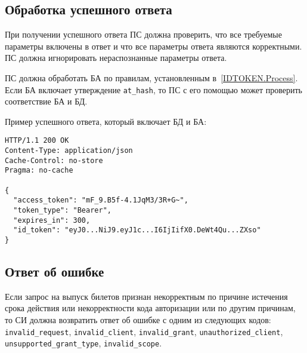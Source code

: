 \subsection{Обработка успешного ответа}\label{REQRESP.Token.Resp}

При получении успешного ответа ПС должна проверить, что все
требуемые параметры включены в ответ и что все параметры ответа являются
корректными. ПС должна игнорировать нераспознанные параметры ответа.

ПС должна обработать БА по правилам, установленным в~\ref{IDTOKEN.Process}.
%
Если БА включает утверждение \lstinline{at_hash}, то ПС с его помощью 
может проверить соответствие БА и БД.

Пример успешного ответа, который включает БД и БА:
%
\begin{lstlisting}
HTTP/1.1 200 OK
Content-Type: application/json
Cache-Control: no-store
Pragma: no-cache

{
  "access_token": "mF_9.B5f-4.1JqM3/3R+G~",
  "token_type": "Bearer",
  "expires_in": 300,
  "id_token": "eyJ0...NiJ9.eyJ1c...I6IjIifX0.DeWt4Qu...ZXso"
}
\end{lstlisting}

\subsection{Ответ об ошибке}\label{REQRESP.Token.Error}

Если запрос на выпуск билетов признан некорректным по причине 
истечения срока действия или некорректности кода авторизации
или по другим причинам, то СИ должна возвратить ответ об ошибке с одним из 
следующих кодов:
\lstinline{invalid_request}, %
\lstinline{invalid_client}, %
\lstinline{invalid_grant}, %
\lstinline{unauthorized_client}, %
\lstinline{unsupported_grant_type}, %
\lstinline{invalid_scope}. %

